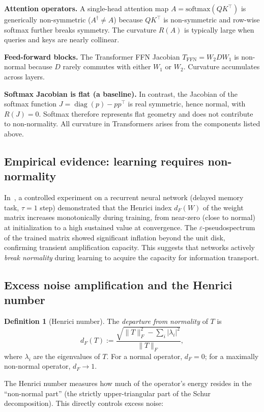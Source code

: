 \documentclass[11pt,a4paper]{article}
\theoremstyle{definition}
\newtheorem{definition}[theorem]{Definition}
\DeclareMathOperator{\diag}{diag}
\begin{document}
\textbf{Attention operators.}
A single-head attention map $A = \mathrm{softmax}(QK^\top)$ is
generically non-symmetric ($A^\dagger \neq A$) because $QK^\top$ is
non-symmetric and row-wise softmax further breaks symmetry. The
curvature $R(A)$ is typically large when queries and keys are
nearly collinear.

\textbf{Feed-forward blocks.}
The Transformer FFN Jacobian $T_{\mathrm{FFN}} = W_2 D W_1$ is
non-normal because $D$ rarely commutes with either $W_1$ or $W_2$.
Curvature accumulates across layers.

\textbf{Softmax Jacobian is flat (a baseline).}
In contrast, the Jacobian of the softmax function
$J = \diag(p) - pp^\top$ is real symmetric, hence normal, with
$R(J) = 0$. Softmax therefore represents flat geometry and does
not contribute to non-normality. All curvature in Transformers
arises from the components listed above.

\subsection{Empirical evidence: learning requires non-normality}

In~\cite{cheng2025nnog}, a controlled experiment on a recurrent
neural network (delayed memory task, $\tau = 1$ step) demonstrated
that the Henrici index $d_F(W)$ of the weight matrix increases
monotonically during training, from near-zero (close to normal) at
initialization to a high sustained value at convergence. The
$\varepsilon$-pseudospectrum of the trained matrix showed significant
inflation beyond the unit disk, confirming transient amplification
capacity. This suggests that networks actively \emph{break normality}
during learning to acquire the capacity for information transport.

\subsection{Excess noise amplification and the Henrici number}

\begin{definition}[Henrici number]
The \emph{departure from normality} of $T$ is
\[
  d_F(T) := \frac{\sqrt{\|T\|_F^2 - \sum_i |\lambda_i|^2}}{\|T\|_F},
\]
where $\lambda_i$ are the eigenvalues of $T$. For a normal operator,
$d_F = 0$; for a maximally non-normal operator, $d_F \to 1$.
\end{definition}

The Henrici number measures how much of the operator's energy resides
in the ``non-normal part'' (the strictly upper-triangular part of the
Schur decomposition). This directly controls excess noise:
\end{document}
